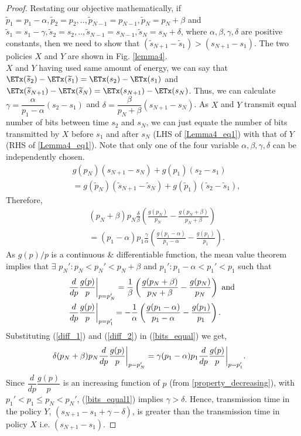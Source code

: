 \begin{proof}
Restating our objective mathematically, if $\widetilde{p}_1=p_1-\alpha,\widetilde{p}_2=p_2,..,\widetilde{p}_{N-1}=p_{N-1},\widetilde{p}_N=p_N+\beta $ and $\widetilde{s}_1=s_1-\gamma,\widetilde{s}_2=s_2,..,\widetilde{s}_{N-1}=s_{N-1},\widetilde{s}_N=s_N+\delta $, where $\alpha ,\beta,\gamma,\delta$ are positive constants, then we need to show that $(\widetilde{s}_{N+1}-\widetilde{s}_1)>(s_{N+1}-s_1)$. The two policies $X$  and $Y$ are shown in Fig. \ref{lemma4}.
\\
$X$ and $Y$ having used same amount of energy, we can say that $\ETx(\widetilde{s}_2)-\ETx(\widetilde{s}_1)=\ETx(s_2)-\ETx(s_1)$ and $\ETx(\widetilde{s}_{N+1})-\ETx(\widetilde{s}_N)=\ETx(s_{N+1})-\ETx(s_N)$. Thus, we can calculate $\gamma=\dfrac{\alpha}{p_1-\alpha}(s_2-s_1)$ and $\delta =\dfrac{\beta}{p_N+\beta}(s_{N+1}-s_N)$. As $X$ and $Y$ transmit equal number of bits between time $s_2$ and $s_N$, we can just equate the number of bits transmitted by $X$ before $s_1$ and after $s_{N}$ (LHS of \eqref{Lemma4_eq1}) with that of $Y$ (RHS of \eqref{Lemma4_eq1}). Note that only one of the four variable $\alpha,\beta,\gamma,\delta$ can be independently chosen.
\\
\begin{align}
&g(p_N)(s_{N+1}-s_N)+g(p_1)(s_2-s_1)\nonumber
\\
&=g(\widetilde{p}_N)(\widetilde{s}_{N+1}-\widetilde{s}_N)+g(\widetilde{p}_1)(\widetilde{s}_2-\widetilde{s}_1)\label{Lemma4_eq1},
\end{align}
Therefore,
\begin{align}
& (p_N+\beta)p_N\frac{\delta}{\beta}\left(\frac{g(p_N)}{p_N}-\frac{g(p_N+\beta)}{p_N+\beta}\right)\nonumber
\\
&=(p_1-\alpha)p_1\frac{\gamma}{\alpha}\left(\frac{g(p_1-\alpha)}{p_1-\alpha}-\frac{g(p_1)}{p_1}\right).\label{bits_equal}
\end{align}
As $g(p)/p$ is a continuous \& differentiable function, the mean value theorem implies that $\exists$ $p_N':p_N<p_N'<p_{N}+\beta$ and $p_1':p_1-\alpha<p_1'<p_{1}$ such that
\begin{align}
&\frac{d}{dp} \frac{g(p)}{p} \bigg{\vert}_{p=p_N'}=\frac{1}{\beta}\left(\frac{g(p_N+\beta)}{p_N+\beta}-\frac{g(p_N)}{p_N}\right)\text{ and }\label{diff_1}
\\
&\frac{d}{dp} \frac{g(p)}{p}\bigg{\vert}_{p=p_1'}=-\frac{1}{\alpha}\left(\frac{g(p_1-\alpha)}{p_1-\alpha}-\frac{g(p_1)}{p_1}\right)\label{diff_2}.
\end{align}
Substituting (\ref{diff_1}) and (\ref{diff_2}) in (\ref{bits_equal}) we get,
\begin{align}
&\delta(p_N+\beta)p_N\frac{d}{dp} \frac{g(p)}{p}  \bigg{\vert}_{p=p_N'}
=\gamma(p_1-\alpha)p_1\frac{d}{dp} \frac{g(p)}{p} \bigg{\vert}_{p=p_1'}.\label{bits_equal1}
\end{align}
Since $\dfrac{d}{dp} \dfrac{g(p)}{p}$ is an increasing function of $p$ (from \eqref{property_decreasing}), with $p_1'<p_1\le p_N<p_N'$, (\ref{bits_equal1}) implies $\gamma >\delta$. Hence, transmission time in the policy $Y$, $\left( s_{N+1}-s_1+\gamma-\delta\right)$, is greater than the transmission time in policy $X$ i.e. $(s_{N+1}-s_1)$.
\end{proof}
